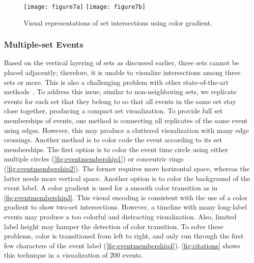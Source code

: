 \begin{figure}
	\centering
		{\texttt{[image: figure7a]}}
	\hfill
		{\texttt{[image: figure7b]}}
	\caption{Visual representations of set intersections using color gradient.}
	\label{fig:gradient}
\end{figure}

\subsubsection{Multiple-set Events}
Based on the vertical layering of sets as discussed earlier, three sets cannot be placed adjacently; therefore, it is unable to visualize intersections among three sets or more. This is also a challenging problem with other state-of-the-art methods~\cite{Alsallakh2014}. To address this issue, similar to non-neighboring sets, we replicate events for each set that they belong to so that all events in the same set stay close together, producing a compact set visualization. To provide full set memberships of events, one method is connecting all replicates of the same event using edges. However, this may produce a cluttered visualization with many edge crossings. Another method is to color code the event according to its set memberships. The first option is to color the event time circle using either multiple circles (\autoref{fig:eventmembership1}) or concentric rings (\autoref{fig:eventmembership2}). The former requires more horizontal space, whereas the latter needs more vertical space. Another option is to color the background of the event label. A color gradient is used for a smooth color transition as in \autoref{fig:eventmembership3}. This visual encoding is consistent with the use of a color gradient to show two-set intersections. However, a timeline with many long-label events may produce a too colorful and distracting visualization. Also, limited label height may hamper the detection of color transition. To solve these problems, color is transitioned from left to right, and only run through the first few characters of the event label (\autoref{fig:eventmembership4}). \autoref{fig:citations} shows this technique in a visualization of 200 events.

